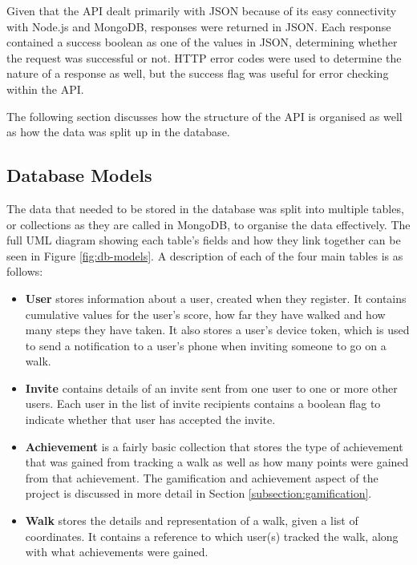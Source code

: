 
Given that the API dealt primarily with JSON because of its easy connectivity with Node.js and MongoDB, responses were returned in JSON. Each response contained a success boolean as one of the values in JSON, determining whether the request was successful or not. HTTP error codes were used to determine the nature of a response as well, but the success flag was useful for error checking within the API.

The following section discusses how the structure of the API is organised as well as how the data was split up in the database.


\subsection{Database Models}


The data that needed to be stored in the database was split into multiple tables, or collections as they are called in MongoDB, to organise the data effectively. The full UML diagram showing each table's fields and how they link together can be seen in Figure \ref{fig:db-models}. A description of each of the four main tables is as follows:

\begin{itemize}
  \item \textbf{User} stores information about a user, created when they register. It contains cumulative values for the user's score, how far they have walked and how many steps they have taken. It also stores a user's device token, which is used to send a notification to a user's phone when inviting someone to go on a walk.

  \item \textbf{Invite} contains details of an invite sent from one user to one or more other users. Each user in the list of invite recipients contains a boolean flag to indicate whether that user has accepted the invite.

  \item \textbf{Achievement} is a fairly basic collection that stores the type of achievement that was gained from tracking a walk as well as how many points were gained from that achievement. The gamification and achievement aspect of the project is discussed in more detail in Section \ref{subsection:gamification}.
 
  \item \textbf{Walk} stores the details and representation of a walk, given a list of coordinates. It contains a reference to which user(s) tracked the walk, along with what achievements were gained.
\end{itemize}

